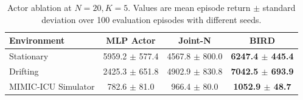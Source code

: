 \begin{table}[h]
  \centering
  \caption{Actor ablation at \(N=20,K=5\). Values are mean episode return \(\pm\) standard deviation over 100 evaluation episodes with different seeds.}
  \label{tab:actor-ablation-n20}
  \small
  \begin{tabular}{lccc}
    \toprule
    Environment & MLP Actor & Joint-N & BIRD \\
    \midrule
    Stationary & 5959.2 $\pm$ 577.4 & 4567.8 $\pm$ 800.0 & \textbf{6247.4 $\pm$ 445.4} \\
    Drifting & 2425.3 $\pm$ 651.8 & 4902.9 $\pm$ 830.8 & \textbf{7042.5 $\pm$ 693.9} \\
    MIMIC-ICU Simulator & 782.6 $\pm$ 81.0 & 966.4 $\pm$ 80.0 & \textbf{1052.9 $\pm$ 48.7} \\
    \bottomrule
  \end{tabular}
\end{table}
